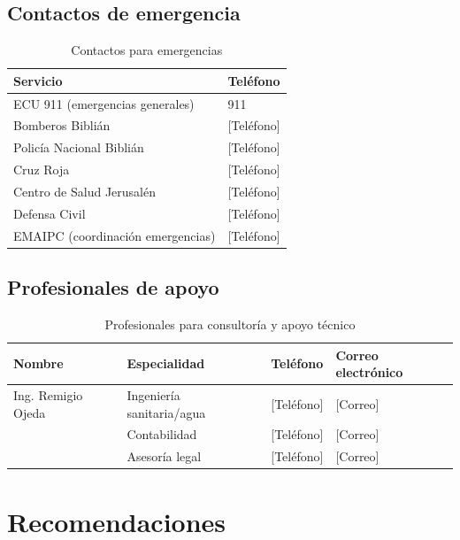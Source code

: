 \subsection*{Contactos de emergencia}

\begin{table}[H]
\centering
\caption{Contactos para emergencias}
\label{tab:contactos-emergencia}
\begin{tabularx}{\textwidth}{@{}lX@{}}
\toprule
\textbf{Servicio} & \textbf{Teléfono} \\
\midrule
ECU 911 (emergencias generales) & 911 \\
Bomberos Biblián & [Teléfono] \\
Policía Nacional Biblián & [Teléfono] \\
Cruz Roja & [Teléfono] \\
Centro de Salud Jerusalén & [Teléfono] \\
Defensa Civil & [Teléfono] \\
EMAIPC (coordinación emergencias) & [Teléfono] \\
\bottomrule
\end{tabularx}
\end{table}

\subsection*{Profesionales de apoyo}

\begin{table}[H]
\centering
\caption{Profesionales para consultoría y apoyo técnico}
\label{tab:contactos-profesionales}
\begin{tabularx}{\textwidth}{@{}lllX@{}}
\toprule
\textbf{Nombre} & \textbf{Especialidad} & \textbf{Teléfono} & \textbf{Correo electrónico} \\
\midrule
Ing. Remigio Ojeda & Ingeniería sanitaria/agua & [Teléfono] & [Correo] \\
[Nombre contador] & Contabilidad & [Teléfono] & [Correo] \\
[Nombre abogado] & Asesoría legal & [Teléfono] & [Correo] \\
\bottomrule
\end{tabularx}
\end{table}

\section*{Recomendaciones}


